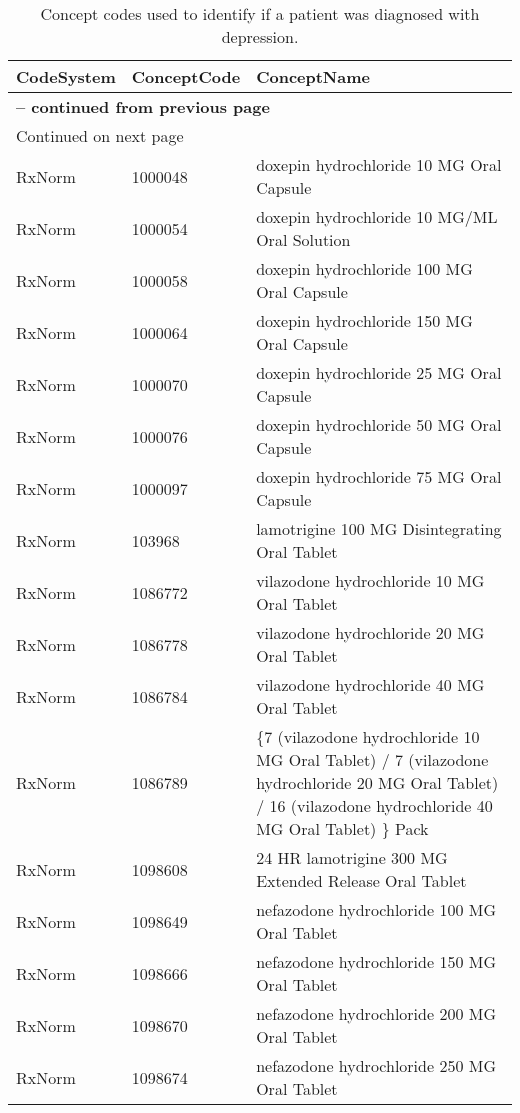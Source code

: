 \begin{longtable}{p{}p{}p{}}
\caption{Concept codes used to identify if a patient was diagnosed with depression.} \\ 
 CodeSystem & ConceptCode & ConceptName \\ 
  \hline 
\endfirsthead 
\multicolumn{3}{p{\textwidth}}{{ \bfseries \tablename \thetable{} -- continued from previous page}} \ 
\hline CodeSystem & ConceptCode & ConceptName \\ \hline 
\endhead 
\hline \multicolumn{3}{p{\textwidth}}{{Continued on next page}} \\ \hline 
\endfoot 
\hline 
\endlastfoot 
 \hline
RxNorm & 1000048 & doxepin hydrochloride 10 MG Oral Capsule \\ 
  RxNorm & 1000054 & doxepin hydrochloride 10 MG/ML Oral Solution \\ 
  RxNorm & 1000058 & doxepin hydrochloride 100 MG Oral Capsule \\ 
  RxNorm & 1000064 & doxepin hydrochloride 150 MG Oral Capsule \\ 
  RxNorm & 1000070 & doxepin hydrochloride 25 MG Oral Capsule \\ 
  RxNorm & 1000076 & doxepin hydrochloride 50 MG Oral Capsule \\ 
  RxNorm & 1000097 & doxepin hydrochloride 75 MG Oral Capsule \\ 
  RxNorm & 103968 & lamotrigine 100 MG Disintegrating Oral Tablet \\ 
  RxNorm & 1086772 & vilazodone hydrochloride 10 MG Oral Tablet \\ 
  RxNorm & 1086778 & vilazodone hydrochloride 20 MG Oral Tablet \\ 
  RxNorm & 1086784 & vilazodone hydrochloride 40 MG Oral Tablet \\ 
  RxNorm & 1086789 & \{7 (vilazodone hydrochloride 10 MG Oral Tablet) / 7 (vilazodone hydrochloride 20 MG Oral Tablet) / 16 (vilazodone hydrochloride 40 MG Oral Tablet) \} Pack \\ 
  RxNorm & 1098608 & 24 HR lamotrigine 300 MG Extended Release Oral Tablet \\ 
  RxNorm & 1098649 & nefazodone hydrochloride 100 MG Oral Tablet \\ 
  RxNorm & 1098666 & nefazodone hydrochloride 150 MG Oral Tablet \\ 
  RxNorm & 1098670 & nefazodone hydrochloride 200 MG Oral Tablet \\ 
  RxNorm & 1098674 & nefazodone hydrochloride 250 MG Oral Tablet \\ 

\end{longtable}
